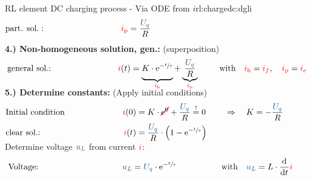 \begin{frame}[t]
{\begin{expl}{RL element DC charging process - Via ODE from $i$}{rl:chargedc:dgli}
\begin{align*}
        &\text{part. sol.}:&&&
            \eci{i_{\mathrm p}} &= \frac{\ecv{U_q}}{R}
        \\[-15pt]&\hphantom{R1oooooooooo}&&&\hphantom{L3ooooooooooo}&\hphantom{R3ooooooooooooooo}&&&&\hphantom{R5oooooooooooooooooo}\nonumber%
    \end{align*}%
    \textbf{4.) Non-homogeneous solution, gen.:} (superposition)%
    \begin{align*}%
        &\text{general sol.:}&&&
            \eci{i}(t) &=
            \underbrace{%
                K \cdot \mathrm{e}^{-\sfrac{t}{\tau}} \vphantom{\frac{\ecv{U_q}}{R}}%
            }_{\eci{i_{\mathrm h}}}
            +
            \underbrace{
                \frac{\ecv{U_q}}{R}
            }_{\eci{i_{\mathrm p}}} &&&
            &\text{with}\quad \eci{i_{\mathrm h}}=\eci{i_f},\quad \eci{i_{\mathrm p}}=\eci{i_e}
        \\[-15pt]&\hphantom{R1oooooooooo}&&&\hphantom{L3ooooooooooo}&\hphantom{R3ooooooooooooooo}&&&&\hphantom{R5oooooooooooooooooo}\nonumber%
        \end{align*}%
    \textbf{5.) Determine constants:} (Apply initial conditions)%
    \begin{align*}%
        &\text{Initial condition}&&&
            \eci{i}(0) &= K \cdot \redcancel{\mathrm{e}^0} + \frac{\ecv{U_q}}{R} \overset{!}{=} 0 &&&
            &\Rightarrow\quad K = -\frac{\ecv{U_q}}{R}\\
        &\text{clear sol.:}&&&
            \eci{i}(t) &= \frac{\ecv{U_q}}{R} \cdot \left( 1 - \mathrm{e}^{-\sfrac{t}{\tau}} \right)
        \\[-15pt]&\hphantom{R1oooooooooo}&&&\hphantom{L3ooooooooooo}&\hphantom{R3ooooooooooooooo}&&&&\hphantom{R5oooooooooooooooooo}\nonumber%
    \end{align*}%
    Determine voltage $\ecv{u_L}$ from current ${\color{red}i}$:%
    \begin{align*}%
        &\text{Voltage:}&&&
            \ecv{u_L} &= \ecv{U_q} \cdot \mathrm{e}^{-\sfrac{t}{\tau}} &&&
            &\text{with}\quad \ecv{u_L} = L \cdot \dt \eci{i}
        \\[-15pt]&\hphantom{R1oooooooooo}&&&\hphantom{L3ooooooooooo}&\hphantom{R3ooooooooooooooo}&&&&\hphantom{R5oooooooooooooooooo}\nonumber%
    \end{align*}
    \endgroup
\end{expl}
}%


\end{frame}
